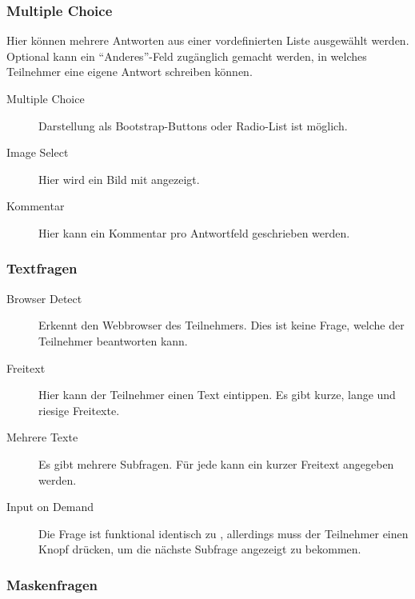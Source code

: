 \subsubsection{Multiple Choice}

Hier können mehrere Antworten aus einer vordefinierten Liste ausgewählt werden.
Optional kann ein \enquote{Anderes}-Feld zugänglich gemacht werden, in welches Teilnehmer eine eigene Antwort schreiben können.

\begin{description}
	\item[Multiple Choice] Darstellung als Bootstrap-Buttons oder Radio-List ist möglich.
	\item[Image Select] Hier wird ein Bild mit angezeigt.
	\item[Kommentar] Hier kann ein Kommentar pro Antwortfeld geschrieben werden.
\end{description}

\subsubsection{Textfragen}

\begin{description}
	\item[Browser Detect] Erkennt den Webbrowser des Teilnehmers. Dies ist keine Frage, welche der Teilnehmer beantworten kann.
	\item[Freitext] Hier kann der Teilnehmer einen Text eintippen. Es gibt kurze, lange und riesige Freitexte.
	\item[Mehrere Texte] Es gibt mehrere Subfragen. Für jede kann ein kurzer Freitext angegeben werden.
	\item[Input on Demand] Die Frage ist funktional identisch zu , allerdings muss der Teilnehmer einen Knopf drücken, um die nächste Subfrage angezeigt zu bekommen.
\end{description}

\subsubsection{Maskenfragen}

